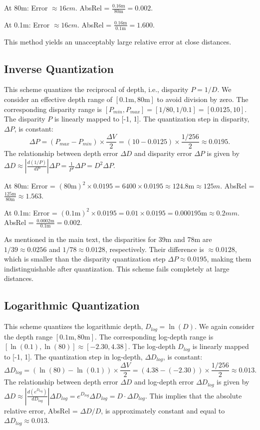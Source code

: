\documentclass{article} %
\begin{document}
{At 80m}:
Error $\approx {16cm}$.
AbsRel = $\frac{0.16\text{m}}{80\text{m}} = {0.002}$.

{At 0.1m}:
Error $\approx {16cm}$.
AbsRel = $\frac{0.16\text{m}}{0.1\text{m}} = {1.600}$.

This method yields an unacceptably large relative error at close distances.

\subsection{Inverse Quantization}
This scheme quantizes the reciprocal of depth, i.e., disparity $P = 1/D$. We consider an effective depth range of $[0.1\text{m}, 80\text{m}]$ to avoid division by zero.
The corresponding disparity range is $[P_{min}, P_{max}] = [1/80, 1/0.1] = [0.0125, 10]$.
The disparity $P$ is linearly mapped to [-1, 1]. The quantization step in disparity, $\Delta P$, is constant:
$$\Delta P = (P_{max} - P_{min}) \times \frac{\Delta V}{2} = (10 - 0.0125) \times \frac{1/256}{2} \approx 0.0195.$$
The relationship between depth error $\Delta D$ and disparity error $\Delta P$ is given by $\Delta D \approx |\frac{d(1/P)}{dP}| \Delta P = \frac{1}{P^2}\Delta P = D^2 \Delta P$.

{At 80m}:
Error = $(80\text{m})^2 \times 0.0195 = 6400 \times 0.0195 \approx 124.8\text{m} \approx {125m}$.
AbsRel = $\frac{125\text{m}}{80\text{m}} \approx {1.563}$.

{At 0.1m}:
Error = $(0.1\text{m})^2 \times 0.0195 = 0.01 \times 0.0195 = 0.000195\text{m} \approx {0.2mm}$.
AbsRel = $\frac{0.0002\text{m}}{0.1\text{m}} = {0.002}$.
        
As mentioned in the main text, the disparities for 39m and 78m are $1/39 \approx 0.0256$ and $1/78 \approx 0.0128$, respectively. Their difference is $\approx 0.0128$, which is smaller than the disparity quantization step $\Delta P \approx 0.0195$, making them indistinguishable after quantization. This scheme fails completely at large distances.

\subsection{Logarithmic Quantization}
This scheme quantizes the logarithmic depth, $D_{log} = \ln(D)$. We again consider the depth range $[0.1\text{m}, 80\text{m}]$.
The corresponding log-depth range is $[\ln(0.1), \ln(80)] \approx [-2.30, 4.38]$.
The log-depth $D_{log}$ is linearly mapped to [-1, 1]. The quantization step in log-depth, $\Delta D_{log}$, is constant:
$$\Delta D_{log} = (\ln(80) - \ln(0.1)) \times \frac{\Delta V}{2} = (4.38 - (-2.30)) \times \frac{1/256}{2} \approx 0.013.$$
The relationship between depth error $\Delta D$ and log-depth error $\Delta D_{log}$ is given by $\Delta D \approx |\frac{d(e^{D_{log}})}{dD_{log}}| \Delta D_{log} = e^{D_{log}} \Delta D_{log} = D \cdot \Delta D_{log}$.
This implies that the absolute relative error, AbsRel = $\Delta D / D$, is approximately constant and equal to $\Delta D_{log} \approx 0.013$.
\end{document}
